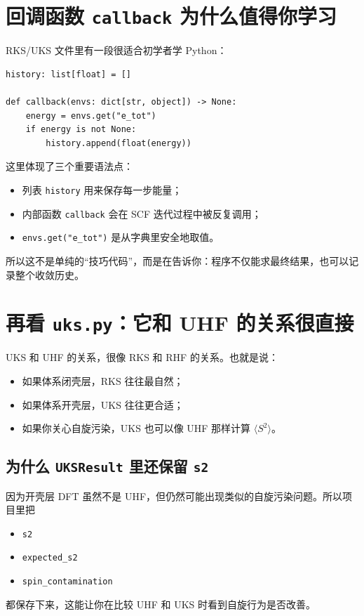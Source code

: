 \documentclass[UTF8,11pt,fontset=fandol]{ctexbook}
\begin{document}
\section{回调函数 \texttt{callback} 为什么值得你学习}

RKS/UKS 文件里有一段很适合初学者学 Python：
\begin{lstlisting}[style=pythonstyle]
history: list[float] = []

def callback(envs: dict[str, object]) -> None:
    energy = envs.get("e_tot")
    if energy is not None:
        history.append(float(energy))
\end{lstlisting}

这里体现了三个重要语法点：
\begin{itemize}
  \item 列表 \texttt{history} 用来保存每一步能量；
  \item 内部函数 \texttt{callback} 会在 SCF 迭代过程中被反复调用；
  \item \texttt{envs.get("e\_tot")} 是从字典里安全地取值。
\end{itemize}

所以这不是单纯的“技巧代码”，而是在告诉你：程序不仅能求最终结果，也可以记录整个收敛历史。

\section{再看 \texttt{uks.py}：它和 UHF 的关系很直接}



UKS 和 UHF 的关系，很像 RKS 和 RHF 的关系。也就是说：
\begin{itemize}
  \item 如果体系闭壳层，RKS 往往最自然；
  \item 如果体系开壳层，UKS 往往更合适；
  \item 如果你关心自旋污染，UKS 也可以像 UHF 那样计算 \(\langle S^2\rangle\)。
\end{itemize}

\subsection*{为什么 \texttt{UKSResult} 里还保留 \texttt{s2}}

因为开壳层 DFT 虽然不是 UHF，但仍然可能出现类似的自旋污染问题。所以项目里把
\begin{itemize}
  \item \texttt{s2}
  \item \texttt{expected\_s2}
  \item \texttt{spin\_contamination}
\end{itemize}
都保存下来，这能让你在比较 UHF 和 UKS 时看到自旋行为是否改善。
\end{document}
